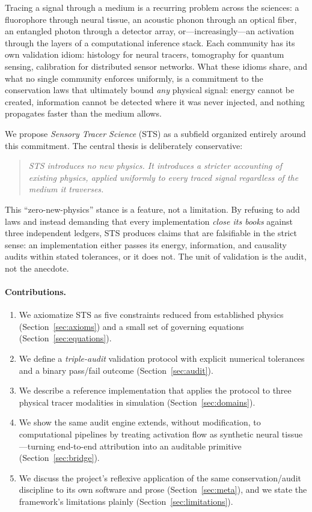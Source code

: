 \documentclass[11pt,a4paper]{article}
\begin{document}
Tracing a signal through a medium is a recurring problem across the sciences: a
fluorophore through neural tissue, an acoustic phonon through an optical fiber, an
entangled photon through a detector array, or---increasingly---an activation
through the layers of a computational inference stack. Each community has its own
validation idiom: histology for neural tracers, tomography for quantum sensing,
calibration for distributed sensor networks. What these idioms share, and what no
single community enforces uniformly, is a commitment to the conservation laws that
ultimately bound \emph{any} physical signal: energy cannot be created, information
cannot be detected where it was never injected, and nothing propagates faster than
the medium allows.

We propose \emph{Sensory Tracer Science} (STS) as a subfield organized entirely
around this commitment. The central thesis is deliberately conservative:

\begin{quote}
\itshape STS introduces no new physics. It introduces a stricter accounting of
existing physics, applied uniformly to every traced signal regardless of the
medium it traverses.
\end{quote}

This ``zero-new-physics'' stance is a feature, not a limitation. By refusing to
add laws and instead demanding that every implementation \emph{close its books}
against three independent ledgers, STS produces claims that are falsifiable in the
strict sense: an implementation either passes its energy, information, and
causality audits within stated tolerances, or it does not. The unit of validation
is the audit, not the anecdote.

\paragraph{Contributions.}
\begin{enumerate}[leftmargin=1.4em]
  \item We axiomatize STS as five constraints reduced from established physics
        (Section~\ref{sec:axioms}) and a small set of governing equations
        (Section~\ref{sec:equations}).
  \item We define a \emph{triple-audit} validation protocol with explicit
        numerical tolerances and a binary pass/fail outcome
        (Section~\ref{sec:audit}).
  \item We describe a reference implementation that applies the protocol to three
        physical tracer modalities in simulation
        (Section~\ref{sec:domains}).
  \item We show the same audit engine extends, without modification, to
        computational pipelines by treating activation flow as synthetic neural
        tissue---turning end-to-end attribution into an auditable primitive
        (Section~\ref{sec:bridge}).
  \item We discuss the project's reflexive application of the same
        conservation/audit discipline to its own software and prose
        (Section~\ref{sec:meta}), and we state the framework's limitations
        plainly (Section~\ref{sec:limitations}).
\end{enumerate}
\end{document}
